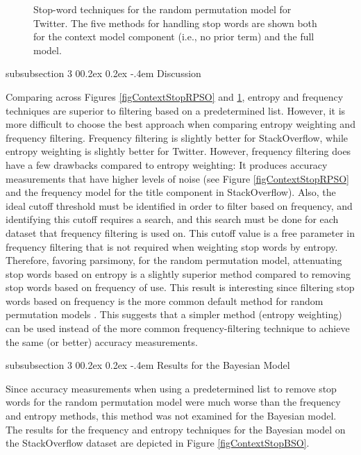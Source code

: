 \documentclass[man,floatsintext,donotrepeattitle]{apa6}
\makeatletter
\renewcommand{\subsubsection}{%
  \@startsection
  {subsubsection}%
  {3}%
  {\parindent}%
  {0\baselineskip \@plus 0.2ex \@minus 0.2ex}%
  {-.4em}%
  {\normalfont\normalsize\bfseries\addperi}}
\makeatother
\begin{document}
\begin{figure}[!htbp]
  \caption{
  Stop-word techniques for the random permutation model for Twitter.
  The five methods for handling stop words are shown both for the context model component (i.e., no prior term) and the full model.
}
  \label{figContextStopRPT}
\end{figure}

\subsubsection{Discussion}

Comparing across Figures \ref{figContextStopRPSO} and \ref{figContextStopRPT}, entropy and frequency techniques are superior to filtering based on a predetermined list.
However, it is more difficult to choose the best approach when comparing entropy weighting and frequency filtering.
Frequency filtering is slightly better for StackOverflow, while entropy weighting is slightly better for Twitter.
However, frequency filtering does have a few drawbacks compared to entropy weighting:
It produces accuracy measurements that have higher levels of noise (see Figure \ref{figContextStopRPSO} and the frequency model for the title component in StackOverflow).
Also, the ideal cutoff threshold must be identified in order to filter based on frequency,
and identifying this cutoff requires a search, and this search must be done for each dataset that frequency filtering is used on.
This cutoff value is a free parameter in frequency filtering that is not required when weighting stop words by entropy.
Therefore, favoring parsimony, for the random permutation model, attenuating stop words based on entropy is a slightly superior method compared to removing stop words based on frequency of use.
This result is interesting since filtering stop words based on frequency is the more common default method for random permutation models \parencite{Sahlgren2008}.
This suggests that a simpler method (entropy weighting) can be used instead of the more common frequency-filtering technique to achieve the same (or better) accuracy measurements.

\subsubsection{Results for the Bayesian Model}

Since accuracy measurements when using a predetermined list to remove stop words for the random permutation model were much worse than the frequency and entropy methods, this method was not examined for the Bayesian model.
The results for the frequency and entropy techniques for the Bayesian model on the StackOverflow dataset are depicted in Figure \ref{figContextStopBSO}.
\end{document}
